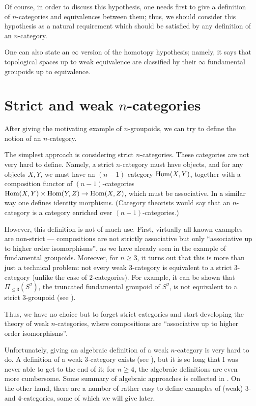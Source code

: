 Of course, in order to discuss this hypothesis, one needs first to give a
definition of $n$-categories and equivalences between them; thus, we should
consider this hypothesis as a natural requirement which should be satisfied by
any definition of an $n$-category.

One can also state an $\infty$ version of the homotopy hypothesis; namely, it
says that topological spaces up to weak equivalence are classified by their
$\infty$ fundamental groupoids up to equivalence.

\section{Strict and weak $n$-categories}\label{s:strict-n-cat}
After giving the motivating example of $n$-groupoids, we can try to
define the notion of an $n$-category.

The simplest approach is considering strict $n$-categories. These categories are
not very hard to define. Namely, a strict $n$-category must have objects, and
for any objects $X,Y$, we must have an $(n-1)$-category $\operatorname{Hom} (X,Y)$, together
with a composition functor of $(n-1)$-categories $\operatorname{Hom}(X,Y)\times \operatorname{Hom}(Y,Z)\to
\operatorname{Hom}(X,Z)$, which must be associative. In a similar way one defines identity
morphisms. (Category theorists would say that an
$n$-category is a category enriched over $(n-1)$-categories.)

However, this definition is not of much use. First, virtually all known examples
are non-strict --- compositions are not strictly associative but only
``associative up to higher order isomorphisms'', as we have already seen in the
example of fundamental groupoids. Moreover, for $n\ge 3$, it turns out that this
is more than just a technical problem: not every weak 3-category is equivalent
to a strict 3-category (unlike the case of 2-categories). For example, it can be
shown that $\Pi_{\leq 3}(S^2)$, the truncated fundamental
groupoid of $S^2$, is not equivalent to a strict 3-groupoid (see
\cite[Theorem 2.7.2]{simpson}).



Thus, we have no choice but to forget strict categories and start developing the
theory of weak $n$-categories, where compositions are ``associative up to
higher order isomorphisms''.


Unfortunately, giving an algebraic definition of a weak $n$-category is very
hard to do. A definition of a weak 3-category exists (see
\cite{gordon-power-street}), but it is so long that I was never able to get to
the end of it; for $n\ge 4$, the algebraic definitions are even more cumbersome.
Some summary of algebraic approaches is collected in \cite{leinster}. On the
other hand, there are a number of rather easy to define examples of (weak) 3-
and 4-categories, some of which we will give later.


